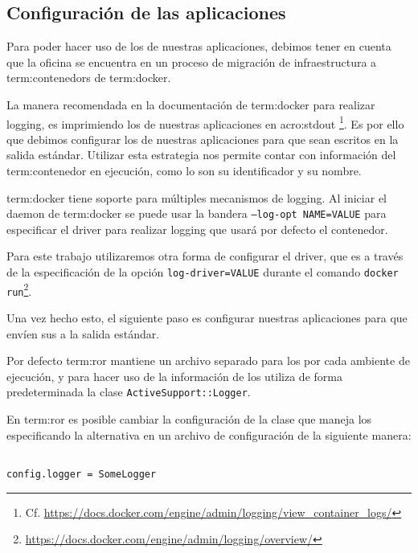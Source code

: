 \subsection{Configuración de las aplicaciones}
\label{configuracion_de_las_aplicaciones}

Para poder hacer uso de los  de nuestras aplicaciones, debimos tener en
cuenta que la oficina se encuentra en un proceso de migración de
infraestructura a \glspl{term:contenedor} de \gls{term:docker}.

La manera recomendada en la documentación de \gls{term:docker} para realizar
logging, es imprimiendo los  de nuestras aplicaciones en \gls{acro:stdout}
\footnote{Cf. \url{https://docs.docker.com/engine/admin/logging/view_container_logs/}}.
Es por ello que debimos configurar los  de nuestras aplicaciones para que sean
escritos en la salida estándar. Utilizar esta estrategia nos permite contar
con información del \gls{term:contenedor} en ejecución, como lo son su identificador y su
nombre.

\gls{term:docker} tiene soporte para múltiples mecanismos de logging. Al
iniciar el daemon de \gls{term:docker} se puede usar la bandera
\texttt{--log-opt NAME=VALUE} para especificar el driver para realizar logging
que usará por defecto el contenedor.

Para este trabajo utilizaremos otra forma de configurar el driver, que es a
través de la especificación de la opción \texttt{log-driver=VALUE} durante el
comando \lstinline{docker run}\footnote{
\url{https://docs.docker.com/engine/admin/logging/overview/}}.

Una vez hecho esto, el siguiente paso es configurar nuestras aplicaciones para
que envíen sus  a la salida estándar.

Por defecto \gls{term:ror} mantiene un archivo separado para los  por cada
ambiente de ejecución, y para hacer uso de la información de los  utiliza
de forma predeterminada la clase \texttt{ActiveSupport::Logger}.

En \gls{term:ror} es posible cambiar la configuración de la clase que maneja los
 especificando la alternativa en un archivo de configuración de la siguiente manera:

\begin{lstlisting}

config.logger = SomeLogger

\end{lstlisting}

